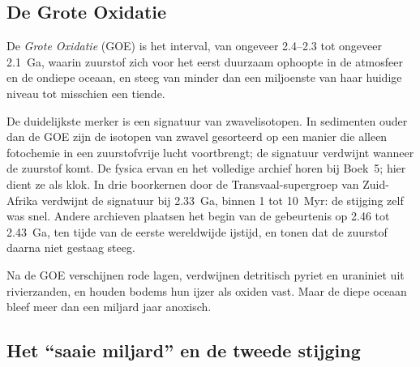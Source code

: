 \subsection*{De Grote Oxidatie}

\begin{definition}\label{def:b2:precambrian-earth:goe}
De \emph{Grote Oxidatie} (GOE) is het interval, van ongeveer
2.4--2.3 tot ongeveer \qty{2.1}{Ga}, waarin zuurstof zich voor het eerst duurzaam ophoopte in de
atmosfeer en de ondiepe oceaan, en steeg van minder dan een miljoenste van haar huidige niveau tot
misschien een tiende.
\end{definition}

De duidelijkste merker is een signatuur van zwavelisotopen. In sedimenten ouder dan de GOE zijn de
isotopen van zwavel gesorteerd op een manier die alleen fotochemie in een zuurstofvrije lucht
voortbrengt; de signatuur verdwijnt wanneer de zuurstof komt. De fysica ervan en het volledige archief horen
bij Boek~5; hier dient ze als klok. In drie boorkernen door de Transvaal-supergroep
van Zuid-Afrika verdwijnt de signatuur bij \qty{2.33}{Ga}, binnen 1 tot \qty{10}{Myr}:
de stijging zelf was snel. Andere archieven plaatsen het begin van de gebeurtenis op 2.46 tot \qty{2.43}{Ga},
ten tijde van de eerste wereldwijde ijstijd, en tonen dat de zuurstof daarna niet gestaag
steeg.

Na de GOE verschijnen rode lagen, verdwijnen detritisch pyriet en uraniniet uit rivierzanden,
en houden bodems hun ijzer als oxiden vast. Maar de diepe oceaan bleef meer dan een miljard
jaar anoxisch.

\subsection*{Het ``saaie miljard'' en de tweede stijging}

